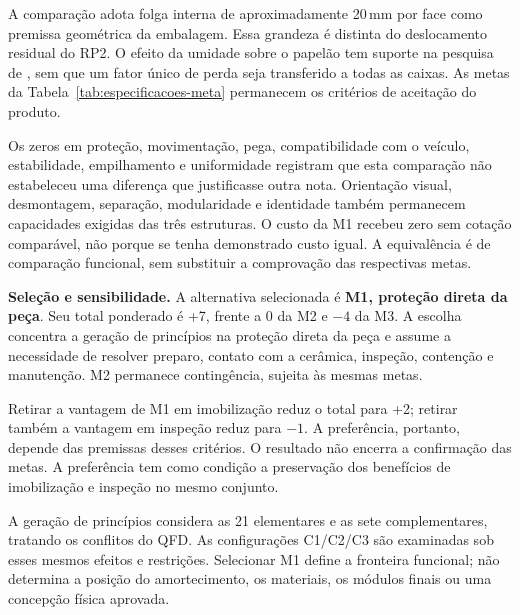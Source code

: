 A comparação adota folga interna de aproximadamente 20\,mm por face como premissa geométrica da embalagem. Essa grandeza é distinta do deslocamento residual do RP2. O efeito da umidade sobre o papelão tem suporte na pesquisa de \citet{brown2019}, sem que um fator único de perda seja transferido a todas as caixas. As metas da Tabela~\ref{tab:especificacoes-meta} permanecem os critérios de aceitação do produto.

Os zeros em proteção, movimentação, pega, compatibilidade com o veículo, estabilidade, empilhamento e uniformidade registram que esta comparação não estabeleceu uma diferença que justificasse outra nota. Orientação visual, desmontagem, separação, modularidade e identidade também permanecem capacidades exigidas das três estruturas. O custo da M1 recebeu zero sem cotação comparável, não porque se tenha demonstrado custo igual. A equivalência é de comparação funcional, sem substituir a comprovação das respectivas metas.

\noindent\textbf{Seleção e sensibilidade.} A alternativa selecionada é \textbf{M1, proteção direta da peça}. Seu total ponderado é +7, frente a 0 da M2 e $-4$ da M3. A escolha concentra a geração de princípios na proteção direta da peça e assume a necessidade de resolver preparo, contato com a cerâmica, inspeção, contenção e manutenção. M2 permanece contingência, sujeita às mesmas metas.

Retirar a vantagem de M1 em imobilização reduz o total para +2; retirar também a vantagem em inspeção reduz para $-1$. A preferência, portanto, depende das premissas desses critérios. O resultado não encerra a confirmação das metas. A preferência tem como condição a preservação dos benefícios de imobilização e inspeção no mesmo conjunto.

A geração de princípios considera as 21 elementares e as sete complementares, tratando os conflitos do QFD. As configurações C1/C2/C3 são examinadas sob esses mesmos efeitos e restrições. Selecionar M1 define a fronteira funcional; não determina a posição do amortecimento, os materiais, os módulos finais ou uma concepção física aprovada.
